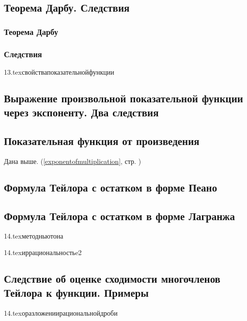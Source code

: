 \subsection{Теорема Дарбу. Следствия}
\subsubsection{Теорема Дарбу}
\subsubsection{Следствия}

{13.tex}{свойствапоказательнойфункции}

\subsection{Выражение произвольной показательной функции через экспоненту. Два следствия}

\subsection{Показательная функция от произведения}
Дана выше. (\ref{exponentofmultiplication}, стр. \pageref{exponentofmultiplication})

\subsection{Формула Тейлора с остатком в форме Пеано}

\subsection{Формула Тейлора с остатком в форме Лагранжа}

{14.tex}{методньютона}

{14.tex}{иррациональностьe2}

\subsection{Следствие об оценке сходимости многочленов Тейлора к функции. Примеры}

{14.tex}{оразложениирациональнойдроби}

